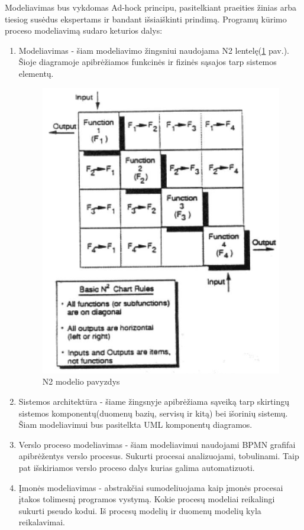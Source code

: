 \documentclass{VUMIFPSkursinis}
\begin{document}
		Modeliavimas bus vykdomas Ad-hock principu, pasitelkiant praeities žinias arba tiesiog susėdus ekspertams ir bandant išsiaiškinti prindimą.
		Programų kūrimo proceso modeliavimą sudaro keturios dalys:
		\begin{enumerate}
			\item Modeliavimas - šiam modeliavimo žingsniui naudojama N2 lentelę(\ref{img:n} pav.). Šioje diagramoje apibrėžiamos funkcinės ir fizinės sąsajos tarp sistemos elementų.
				\begin{figure}[H]
				\centering
				\includegraphics[scale=0.7]{img/NN}
				\caption{N2 modelio pavyzdys} %
				\label{img:n}
				\end{figure}
			\item{Sistemos architektūra - šiame žingsnyje apibrėžiama sąveiką tarp skirtingų sistemos komponentų(duomenų bazių, servisų ir kitą) bei išorinių sistemų. Šiam modeliavimui bus pasitelkta UML komponentų diagramos.}
			\item{Verslo proceso modeliavimas - šiam modeliavimui naudojami BPMN grafifai apibrėžentys verslo procesus. Sukurti procesai analizuojami, tobulinami. Taip pat išskiriamos verslo proceso dalys kurias galima automatizuoti.}
			\item{Įmonės modeliavimas - abstrakčiai sumodeliuojama kaip įmonės procesai įtakos tolimesnį programos vystymą. 
				Kokie procesų modeliai reikalingi sukurti pseudo kodui. Iš procesų modelių ir duomenų modelių kyla reikalavimai. }

		\end{enumerate}
\end{document}
